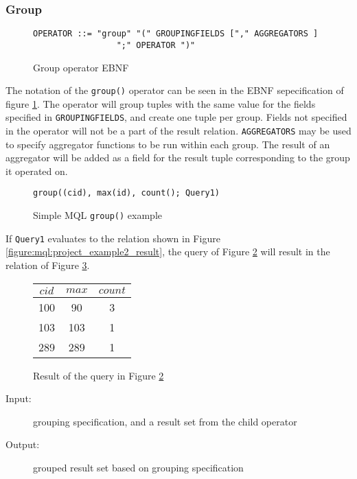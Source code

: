 \subsubsection{Group}

\begin{figure}[!h]
\begin{Verbatim}
OPERATOR ::= "group" "(" GROUPINGFIELDS ["," AGGREGATORS ] 
                 ";" OPERATOR ")"
\end{Verbatim}
\label{figure:mql:groupEBNF}
\caption{Group operator EBNF}
\end{figure}

The notation of the \texttt{group()} operator can be seen in the EBNF sepecification of figure
\ref{figure:mql:groupEBNF}. The operator will group tuples with the same value for the fields specified in
\texttt{GROUPINGFIELDS}, and create one tuple per group. Fields not specified in the operator will not be a part
of the result relation. \texttt{AGGREGATORS} may be used to specify aggregator functions to be run within each
group. The result of an aggregator will be added as a field for the result tuple corresponding to the group it
operated on.

\begin{figure}[!h]
\begin{Verbatim}
group((cid), max(id), count(); Query1)
\end{Verbatim}
\caption{Simple MQL \texttt{group()} example}
\label{figure:mql:groupEx}
\end{figure}

If \texttt{Query1} evaluates to the relation shown in Figure \ref{figure:mql:project_example2_result}, the query
of Figure \ref{figure:mql:groupEx} will result in the relation of Figure \ref{figure:mql:groupres}.

\begin{figure}[!h]
\centering
\begin{tabular}{|c|c|c|} \hline
$cid$ & $max$ & $count$ \\ \hline
100 & 90 & 3 \\ \hline
103 & 103 & 1 \\ \hline
289 & 289 & 1 \\ \hline
\end{tabular}
\caption{Result of the query in Figure \ref{figure:mql:groupEx}}
\label{figure:mql:groupres}
\end{figure}

\begin{description}
  \item[Input:] grouping specification, and a result set from the child operator
  \item[Output:] grouped result set based on grouping specification
\end{description}

